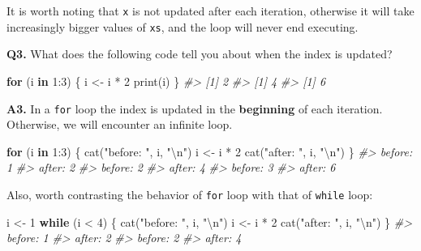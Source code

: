 \documentclass[
]{book}
\newenvironment{Shaded}{\begin{snugshade}}{\end{snugshade}}
\newcommand{\CommentTok}[1]{\textcolor[rgb]{0.56,0.35,0.01}{\textit{#1}}}
\newcommand{\ControlFlowTok}[1]{\textcolor[rgb]{0.13,0.29,0.53}{\textbf{#1}}}
\newcommand{\DecValTok}[1]{\textcolor[rgb]{0.00,0.00,0.81}{#1}}
\newcommand{\FunctionTok}[1]{\textcolor[rgb]{0.00,0.00,0.00}{#1}}
\newcommand{\NormalTok}[1]{#1}
\newcommand{\OtherTok}[1]{\textcolor[rgb]{0.56,0.35,0.01}{#1}}
\newcommand{\SpecialCharTok}[1]{\textcolor[rgb]{0.00,0.00,0.00}{#1}}
\newcommand{\StringTok}[1]{\textcolor[rgb]{0.31,0.60,0.02}{#1}}
\begin{document}
It is worth noting that \texttt{x} is not updated after each iteration, otherwise it will take increasingly bigger values of \texttt{xs}, and the loop will never end executing.

\textbf{Q3.} What does the following code tell you about when the index is updated?

\begin{Shaded}
\begin{Highlighting}[]
\ControlFlowTok{for}\NormalTok{ (i }\ControlFlowTok{in} \DecValTok{1}\SpecialCharTok{:}\DecValTok{3}\NormalTok{) \{}
\NormalTok{  i }\OtherTok{\textless{}{-}}\NormalTok{ i }\SpecialCharTok{*} \DecValTok{2}
  \FunctionTok{print}\NormalTok{(i)}
\NormalTok{\}}
\CommentTok{\#\textgreater{} [1] 2}
\CommentTok{\#\textgreater{} [1] 4}
\CommentTok{\#\textgreater{} [1] 6}
\end{Highlighting}
\end{Shaded}

\textbf{A3.} In a \texttt{for} loop the index is updated in the \textbf{beginning} of each iteration. Otherwise, we will encounter an infinite loop.

\begin{Shaded}
\begin{Highlighting}[]
\ControlFlowTok{for}\NormalTok{ (i }\ControlFlowTok{in} \DecValTok{1}\SpecialCharTok{:}\DecValTok{3}\NormalTok{) \{}
  \FunctionTok{cat}\NormalTok{(}\StringTok{"before: "}\NormalTok{, i, }\StringTok{"}\SpecialCharTok{\textbackslash{}n}\StringTok{"}\NormalTok{)}
\NormalTok{  i }\OtherTok{\textless{}{-}}\NormalTok{ i }\SpecialCharTok{*} \DecValTok{2}
  \FunctionTok{cat}\NormalTok{(}\StringTok{"after:  "}\NormalTok{, i, }\StringTok{"}\SpecialCharTok{\textbackslash{}n}\StringTok{"}\NormalTok{)}
\NormalTok{\}}
\CommentTok{\#\textgreater{} before:  1 }
\CommentTok{\#\textgreater{} after:   2 }
\CommentTok{\#\textgreater{} before:  2 }
\CommentTok{\#\textgreater{} after:   4 }
\CommentTok{\#\textgreater{} before:  3 }
\CommentTok{\#\textgreater{} after:   6}
\end{Highlighting}
\end{Shaded}

Also, worth contrasting the behavior of \texttt{for} loop with that of \texttt{while} loop:

\begin{Shaded}
\begin{Highlighting}[]
\NormalTok{i }\OtherTok{\textless{}{-}} \DecValTok{1}
\ControlFlowTok{while}\NormalTok{ (i }\SpecialCharTok{\textless{}} \DecValTok{4}\NormalTok{) \{}
  \FunctionTok{cat}\NormalTok{(}\StringTok{"before: "}\NormalTok{, i, }\StringTok{"}\SpecialCharTok{\textbackslash{}n}\StringTok{"}\NormalTok{)}
\NormalTok{  i }\OtherTok{\textless{}{-}}\NormalTok{ i }\SpecialCharTok{*} \DecValTok{2}
  \FunctionTok{cat}\NormalTok{(}\StringTok{"after:  "}\NormalTok{, i, }\StringTok{"}\SpecialCharTok{\textbackslash{}n}\StringTok{"}\NormalTok{)}
\NormalTok{\}}
\CommentTok{\#\textgreater{} before:  1 }
\CommentTok{\#\textgreater{} after:   2 }
\CommentTok{\#\textgreater{} before:  2 }
\CommentTok{\#\textgreater{} after:   4}
\end{Highlighting}
\end{Shaded}
\end{document}
